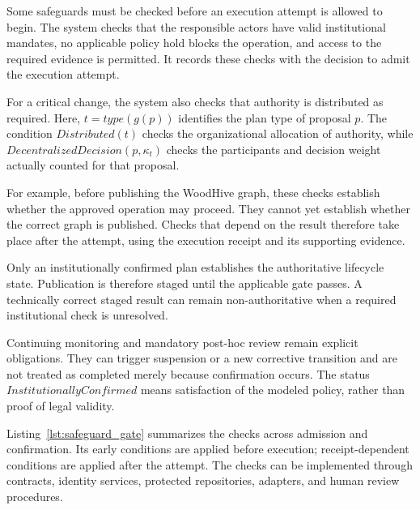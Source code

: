 \documentclass[journal]{IEEEtran}
\begin{document}
Some safeguards must be checked before an execution attempt
is allowed to begin. The system checks that the responsible
actors have valid institutional mandates, no applicable
policy hold blocks the operation, and access to the required
evidence is permitted. It records these checks with the
decision to admit the execution attempt.

For a critical change, the system also checks that authority
is distributed as required. Here, $t=type(g(p))$ identifies
the plan type of proposal $p$. The condition $Distributed(t)$
checks the organizational allocation of authority, while
$DecentralizedDecision(p,\kappa_t)$ checks the participants
and decision weight actually counted for that proposal.

For example, before publishing the WoodHive graph, these
checks establish whether the approved operation may proceed.
They cannot yet establish whether the correct graph is
published. Checks that depend on the result therefore take
place after the attempt, using the execution receipt and
its supporting evidence.

Only an institutionally confirmed plan establishes the
authoritative lifecycle state. Publication is therefore
staged until the applicable gate passes. A technically
correct staged result can remain non-authoritative when
a required institutional check is unresolved.

Continuing monitoring and mandatory post-hoc review remain
explicit obligations. They can trigger suspension or a new
corrective transition and are not treated as completed
merely because confirmation occurs. The status
$InstitutionallyConfirmed$ means satisfaction of the modeled
policy, rather than proof of legal validity.

Listing~\ref{lst:safeguard_gate} summarizes the checks across
admission and confirmation. Its early conditions are applied
before execution; receipt-dependent conditions are applied
after the attempt. The checks can be implemented through
contracts, identity services, protected repositories,
adapters, and human review procedures.
\end{document}
